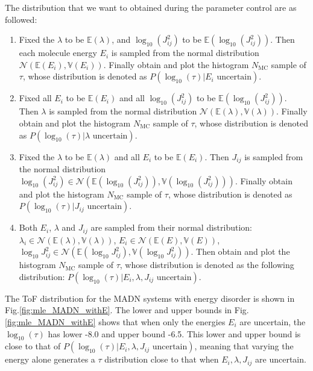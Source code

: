\documentclass[letterpaper,12pt]{article}
\begin{document}
The distribution that we want to obtained during the parameter control are as followed:
\begin{enumerate}
    \item Fixed the $\lambda$ to be $\mathbb{E}(\lambda)$, and $\log_{10}(J_{ij}^2)$ to be $\mathbb{E}(\log_{10}(J_{ij}^2))$. Then each molecule energy $E_i$ is sampled from the normal distribution $\mathcal{N}(\mathbb{E}(E_i), \mathbb{V}(E_i))$. Finally obtain and plot the histogram $N_\text{MC}$ sample of $\tau$, whose distribution is denoted as $P(\log_{10}(\tau)|E_i \text{ uncertain})$.
    \item Fixed all $E_i$ to be $\mathbb{E}(E_i)$ and all $\log_{10}(J_{ij}^2)$ to be $\mathbb{E}(\log_{10}(J_{ij}^2))$. Then $\lambda$ is sampled from the normal distribution $\mathcal{N}(\mathbb{E}(\lambda), \mathbb{V}(\lambda))$. Finally obtain and plot the histogram  $N_\text{MC}$ sample of $\tau$, whose distribution is denoted as $P(\log_{10}(\tau)|\lambda \text{ uncertain})$. 
    \item Fixed the $\lambda$ to be $\mathbb{E}(\lambda)$ and all $E_i$ to be $\mathbb{E}(E_i)$.     Then $J_{ij}$ is sampled from the normal distribution $\log_{10}(J_{ij}^2) \in \mathcal{N}(\mathbb{E}(\log_{10}(J_{ij}^2)), \mathbb{V}(\log_{10}(J_{ij}^2)))$. Finally obtain and plot the histogram  $N_\text{MC}$ sample of $\tau$, whose distribution is denoted as $P(\log_{10}(\tau)|J_{ij} \text{ uncertain})$.
    \item Both $E_i$, $\lambda$ and $J_{ij}$ are sampled from their normal distribution:$\lambda_i \in \mathcal{N}(\mathbb{E}(\lambda), \mathbb{V}(\lambda))$, $E_i \in \mathcal{N}(\mathbb{E}(E), \mathbb{V}(E))$, $\log_{10}J_{ij}^2 \in \mathcal{N}(\mathbb{E}(\log_{10}J_{ij}^2), \mathbb{V}(\log_{10}J_{ij}^2))$. Then obtain and plot the histogram $N_\text{MC}$ sample of $\tau$, whose distribution is denoted as the following distribution: 
    $P(\log_{10}(\tau)|E_i, \lambda, J_{ij} \text{ uncertain})$.
\end{enumerate}


The ToF distribution for the MADN systems with energy disorder is shown in Fig.\ref{fig:mle_MADN_withE}.
The lower and upper bounds in Fig. \ref{fig:mle_MADN_withE} shows that when only the energies $E_i$ are uncertain, the $\log_{10}(\tau)$ has lower -8.0 and upper bound -6.5. This lower and upper bound is close to that of $P(\log_{10}(\tau)|E_i, \lambda, J_{ij} \text{ uncertain})$, meaning that varying the energy alone generates a $\tau$ distribution close to that when $E_i, \lambda, J_{ij}$ are uncertain. 
\end{document}
